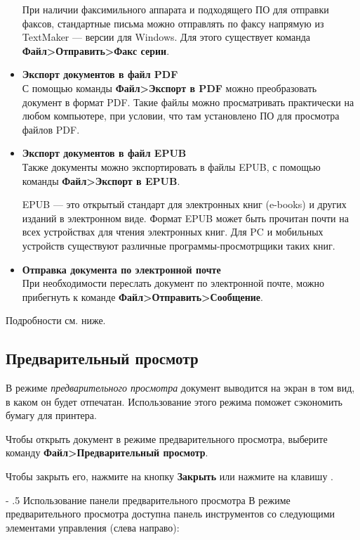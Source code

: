 ﻿\documentclass[a4paper,10pt]{article}
\makeatletter
\renewcommand\paragraph{%
   \@startsection{paragraph}{4}{0mm}%
      {-\baselineskip}%
      {.5\baselineskip}%
      {\normalfont\normalsize\bfseries}}
\makeatother
\begin{document}
\begin{itemize}
\begin{mdframed}[backgroundcolor=pink!50]
\end{mdframed}
При наличии факсимильного аппарата и подходящего ПО для отправки факсов, стандартные письма можно отправлять по факсу напрямую из TextMaker — версии для Windows. Для этого существует команда \textbf{Файл>Отправить>Факс серии}.
\item \textbf{Экспорт документов в файл PDF}\\
 С помощью команды \textbf{Файл>Экспорт в PDF} можно преобразовать документ в формат PDF. Такие файлы можно просматривать практически на любом компьютере, при условии, что там установлено ПО для просмотра файлов PDF.
 \item \textbf{Экспорт документов в файл EPUB}\\
 Также документы можно экспортировать в файлы EPUB, с помощью команды \textbf{Файл>Экспорт в EPUB}.
 
 EPUB — это открытый стандарт для электронных книг (e-books) и других изданий в электронном виде. Формат EPUB может быть прочитан почти на всех устройствах для чтения электронных книг. Для PC и мобильных устройств существуют различные программы-просмотрщики таких книг.
 \item \textbf{Отправка документа по электронной почте}\\
 При необходимости переслать документ по электронной почте, можно прибегнуть к команде \textbf{Файл>Отправить>Сообщение}.
\end{itemize}

Подробности см. ниже.

\subsection{Предварительный просмотр}
В режиме \textit{предварительного просмотра} документ выводится на экран в том вид, в каком он будет отпечатан. Использование этого режима поможет сэкономить бумагу для принтера.

Чтобы открыть документ в режиме предварительного просмотра, выберите команду \textbf{Файл>Предварительный просмотр}.

Чтобы закрыть его, нажмите на кнопку \textbf{Закрыть} или нажмите на клавишу .

\paragraph{Использование панели предварительного просмотра}
В режиме предварительного просмотра доступна панель инструментов со следующими элементами управления (слева направо):
\end{document}
